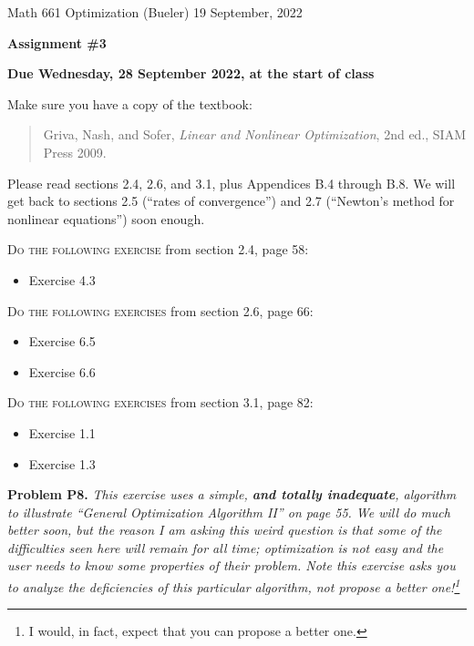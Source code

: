 \documentclass[12pt]{amsart}
\newcommand{\prob}[1]{\bigskip\noindent\textbf{#1}\quad }
\begin{document}
\scriptsize \noindent Math 661 Optimization (Bueler) \hfill 19 September, 2022
\normalsize

\medskip\bigskip

\Large\centerline{\textbf{Assignment \#3}}
\large
\bigskip

\centerline{\textbf{Due Wednesday, 28 September 2022, at the start of class}}
\bigskip
\normalsize

\thispagestyle{empty}

\bigskip
\noindent Make sure you have a copy of the textbook:

\begin{quote}
Griva, Nash, and Sofer, \emph{Linear and Nonlinear Optimization}, 2nd ed., SIAM Press 2009.
\end{quote}

\noindent Please read sections 2.4, 2.6, and 3.1, plus Appendices B.4 through B.8.  We will get back to sections 2.5 (``rates of convergence'') and 2.7 (``Newton's method for nonlinear equations'') soon enough.

\bigskip
\noindent \textsc{Do the following exercise} from section 2.4, page 58:

\begin{itemize}
\item Exercise 4.3
\end{itemize}

\bigskip
\noindent \textsc{Do the following exercises} from section 2.6, page 66:

\begin{itemize}
\item Exercise 6.5
\item Exercise 6.6
\end{itemize}

\bigskip
\noindent \textsc{Do the following exercises} from section 3.1, page 82:

\begin{itemize}
\item Exercise 1.1
\item Exercise 1.3
\end{itemize}

\prob{Problem P8.}  \emph{This exercise uses a simple, \textbf{\emph{and totally inadequate}}, algorithm to illustrate ``General Optimization Algorithm II'' on page 55.  We will do much better soon, but the reason I am asking this weird question is that some of the difficulties seen here will remain for all time; optimization is not easy and the user needs to know some properties of their problem.  Note this exercise asks you to analyze the deficiencies of this particular algorithm, not propose a better one!\footnote{I would, in fact, expect that you can propose a better one.}}
\end{document}
